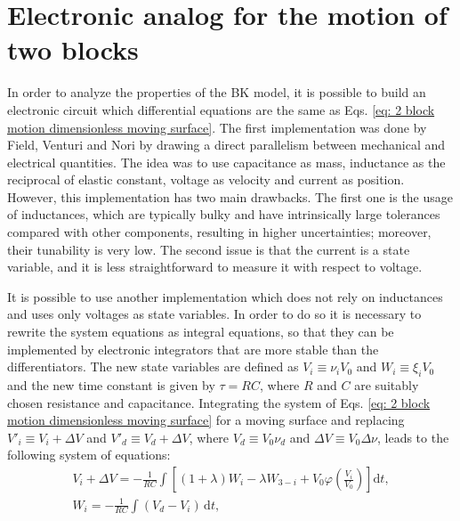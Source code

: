 \section{Electronic analog for the motion of two blocks}
\label{sec: electronic analog}

In order to analyze the properties of the BK model, it is possible to build an electronic circuit
which differential equations are the same as Eqs. \ref{eq: 2 block motion dimensionless moving surface}.
The first implementation was done by Field, Venturi and Nori \cite{ref:fvn} by drawing a direct parallelism
between mechanical and electrical quantities. The idea was to use capacitance as mass,
inductance as the reciprocal of elastic constant, voltage as velocity and current as position.
However, this implementation has two main drawbacks. The first one is the usage of inductances, which are typically
bulky and have intrinsically large tolerances compared with other components, resulting in higher uncertainties; moreover,
their tunability is very low. The second issue is that the current is a state variable, and it is less straightforward
to measure it with respect to voltage.

It is possible to use another implementation \cite{ref:electronic_analog} which does not rely on inductances
and uses only voltages as state variables. In order to do so it is necessary to rewrite the system equations
as integral equations, so that they can be implemented by electronic integrators that are more stable than
the differentiators. The new state variables are defined as $V_i\equiv \nu_i V_0$ and $W_i\equiv \xi_i V_0$ and
the new time constant is given by $\tau=RC$, where $R$ and $C$ are suitably chosen resistance and capacitance.
Integrating the system of Eqs. \ref{eq: 2 block motion dimensionless moving surface} for a moving surface and replacing
$V'_i\equiv V_i+\Delta V$ and $V'_d\equiv V_d+\Delta V$, where $V_d\equiv V_0\nu_d$ and $\Delta V\equiv V_0\Delta\nu$,
leads to the following system of equations:
\begin{equation}
    \label{eq: 2 block motion electronig}
    \begin{gathered}
        V_i+\Delta V=-\frac{1}{RC}\int\left[ (1+\lambda)W_i - \lambda W_{3-i}+V_0\varphi\left(\frac{V_i}{V_0}\right) \right]\text{d}t ,\\[10pt]
        W_i=-\frac{1}{RC}\int(V_d-V_i)\,\text{d}t,
    \end{gathered}
\end{equation}

